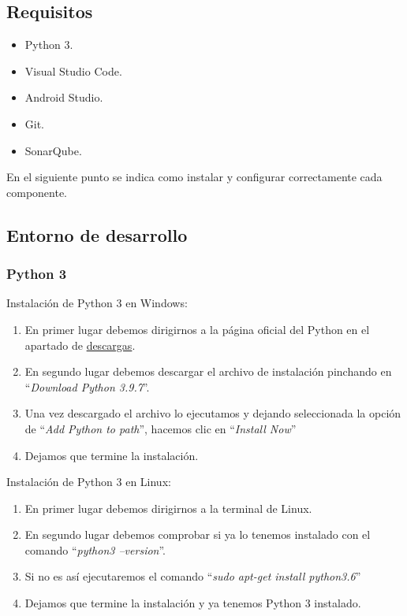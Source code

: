 \subsection{Requisitos}

\begin{itemize}
\item
	Python 3.
\item
	Visual Studio Code.
\item
	Android Studio.
\item
	Git.
\item
	SonarQube.
\end{itemize}

En el siguiente punto se indica como instalar y configurar correctamente cada componente.


\subsection{Entorno de desarrollo}

\subsubsection{Python 3}

Instalación de Python 3 en Windows:
\begin{enumerate}
\item
	En primer lugar debemos dirigirnos a la página oficial del Python en el apartado de \href{https://www.python.org/downloads/}{descargas}.
\item
	En segundo lugar debemos descargar el archivo de instalación pinchando en ``\textit{Download Python 3.9.7}''.
\item
	Una vez descargado el archivo lo ejecutamos y dejando seleccionada la opción de ``\textit{Add Python to path}'', hacemos clic en ``\textit{Install Now}''
\item
	Dejamos que termine la instalación.
\end{enumerate}

Instalación de Python 3 en Linux:
\begin{enumerate}
\item
	En primer lugar debemos dirigirnos a la terminal de Linux.
\item
	En segundo lugar debemos comprobar si ya lo tenemos instalado con el comando ``\textit{python3 --version}''.
\item
	Si no es así ejecutaremos el comando ``\textit{sudo apt-get install python3.6}''
\item
	Dejamos que termine la instalación y ya tenemos Python 3 instalado.
\end{enumerate}

